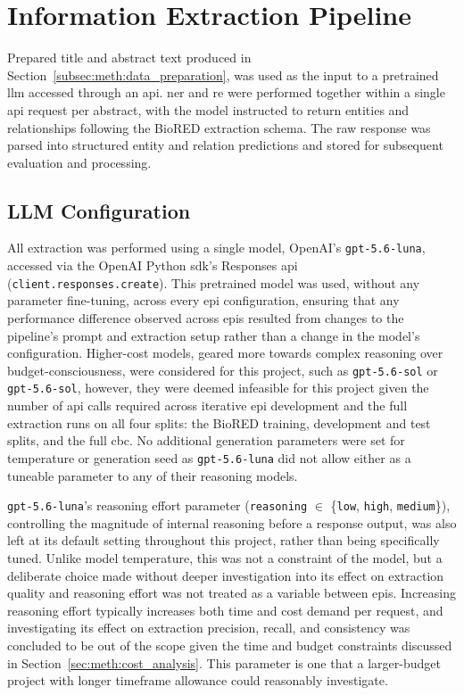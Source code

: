 \section{Information Extraction Pipeline}
\label{sec:meth:info_extraction_pipeline}
Prepared title and abstract text produced in Section~\ref{subsec:meth:data_preparation}, was used as the input to a pretrained \gls{llm} accessed through an \gls{api}. \gls{ner} and \gls{re} were performed together within a single \gls{api} request per abstract, with the model instructed to return entities and relationships following the BioRED extraction schema. The raw response was parsed into structured entity and relation predictions and stored for subsequent evaluation and processing.

\subsection{LLM Configuration}
\label{subsec:meth:llm_config}
All extraction was performed using a single model, OpenAI's \verb|gpt-5.6-luna|, accessed via the OpenAI Python \gls{sdk}'s Responses \gls{api} (\verb|client.responses.create|). This pretrained model was used, without any parameter fine-tuning, across every \gls{epi} configuration, ensuring that any performance difference observed across \glspl{epi} resulted from changes to the pipeline's prompt and extraction setup rather than a change in the model's configuration. Higher-cost models, geared more towards complex reasoning over budget-consciousness, were considered for this project, such as \verb|gpt-5.6-sol| or \verb|gpt-5.6-sol|, however, they were deemed infeasible for this project given the number of \gls{api} calls required across iterative \gls{epi} development and the full extraction runs on all four splits: the BioRED training, development and test splits, and the full \gls{cbc}. No additional generation parameters were set for temperature or generation seed as \verb|gpt-5.6-luna| did not allow either as a tuneable parameter to any of their reasoning models.

\verb|gpt-5.6-luna|'s reasoning effort parameter (\verb|reasoning| $\in$ \{\verb|low|, \verb|high|, \verb|medium|\}), controlling the magnitude of internal reasoning before a response output, was also left at its default setting throughout this project, rather than being specifically tuned. Unlike model temperature, this was not a constraint of the model, but a deliberate choice made without deeper investigation into its effect on extraction quality and reasoning effort was not treated as a variable between \glspl{epi}. Increasing reasoning effort typically increases both time and cost demand per request, and investigating its effect on extraction precision, recall, and consistency was concluded to be out of the scope given the time and budget constraints discussed in Section~\ref{sec:meth:cost_analysis}. This parameter is one that a larger-budget project with longer timeframe allowance could reasonably investigate.

